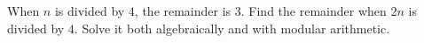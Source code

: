 When $n$ is divided by $4$, the remainder is $3$. Find the remainder when $2n$ is divided by $4$. Solve it both algebraically and with modular arithmetic.
